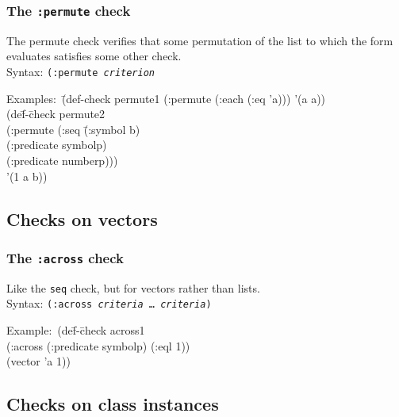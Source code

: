 \subsubsection{The \texttt{:permute} check}
The permute check verifies that some permutation of the list to which
the form evaluates satisfies some other check.
\\ Syntax: \texttt{(:permute \textit{criterion}}
{\ttfamily\begin{tabbing}
\textrm{Examples:}\ \=(def-check permute1 (:permute (:each (:eq 'a))) '(a a))
\\ \> (de\=f-\=check permute2
\\ \> \> \> (:permute (:seq \=(:symbol b)
\\ \> \> \>             \>(:predicate symbolp)
\\ \> \> \>             \>(:predicate numberp)))
\\ \> \>'(1 a b))
\end{tabbing}}

\subsection{Checks on vectors}

\subsubsection{The \texttt{:across} check}
Like the \texttt{seq} check, but for vectors rather than
lists.
\\ Syntax: \texttt{(:across \emph{criteria} \ldots\ \emph{criteria})}
{\ttfamily\begin{tabbing}
\textrm{Example:}\ (de\=f-\=check across1
\\ \>\>  (:across (:predicate symbolp) (:eql 1))
\\ \>  (vector 'a 1))
\end{tabbing}}

\subsection{Checks on class instances}


